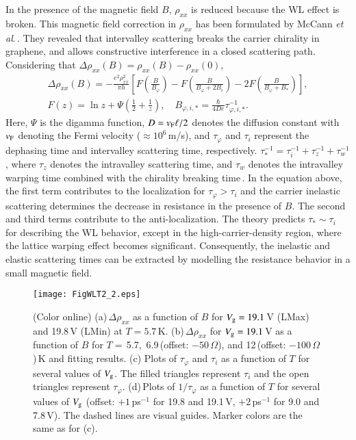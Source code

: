 \documentclass[final,5p,times,twocolumn]{elsarticle}
\begin{document}
In the presence of the magnetic field $B$, $\rho_{xx}$ is reduced because the WL effect is broken.
This magnetic field correction in $\rho_{xx}$ has been formulated by McCann {\it et al}.\,\cite{McCann}.
They revealed that intervalley scattering breaks the carrier chirality in graphene, and allows constructive interference in a closed scattering path.
Considering that $\Delta \rho_{xx}(B) = \rho_{xx}(B) - \rho_{xx}(0)$,  
%
\begin{gather}
\Delta \rho_{xx}(B) = -\frac{e^2 \rho_{xx}^2}{\pi h} \left [ F \left(\frac{B}{B_\varphi}\right)-F\left(\frac{B}{B_\varphi+2B_i}\right) - 2F\left( \frac{B}{B_\varphi + B_\ast} \right) \right ],  \label{eqDR} \\
%
F(z) = \ln z+\varPsi \left( \frac{1}{2} + \frac{1}{z} \right),\mspace{18mu} B_{\varphi, i, \ast} = \frac{\hbar}{4De}\tau^{-1}_{\varphi, i, \ast}. \label{eqtau}
\end{gather}
Here,  $\varPsi$ is the digamma function, $D=v_{\rm F}\ell/2$ denotes the diffusion constant with $v_{\rm F}$ denoting the Fermi velocity ($ \approx 10^6$\,m/s),
and $\tau_\varphi$ and $\tau_i$ represent the dephasing time and intervalley scattering time, respectively.
$\tau_\ast^{-1} = \tau_i ^{-1} + \tau_z^{-1} + \tau_w^{-1}$, where $\tau_z$ denotes the intravalley scattering time, and $\tau_w$ denotes the intravalley warping time combined with the chirality breaking time\,\cite{Morpurgo}.
In the equation above, the first term contributes to the localization for $\tau_\varphi > \tau_i$ and the carrier inelastic scattering determines the decrease in resistance in the presence of $B$.
The second and third terms contribute to the anti-localization.
The theory predicts $\tau_\ast \sim \tau_i$ for describing the WL behavior, except in the high-carrier-density region, where the lattice warping effect becomes significant. 
Consequently, the inelastic and elastic scattering times can be extracted by modelling the resistance behavior in a small magnetic field.




\begin{figure}  [t]
\texttt{[image: FigWLT2\_2.eps]}
\caption{\label{figWLT2}(Color online) (a)\,$\Delta \rho_{xx}$  as a function of $B$ for $V_{\rm g}= 19.1$\,V (LMax) and 19.8\,V (LMin) at $T=5.7$\,K. (b)\,$\Delta \rho_{xx}$ for $V_{\rm g}= 19.1$\,V as a function of $B$ for $T=$\,5.7,\, 6.9\,(offset: $-50$\,$\Omega$), and 12\,(offset: $-100$\,$\Omega$)\,K and fitting results. (c) Plots of $\tau_\varphi$ and $\tau_i$ as a function of $T$ for several values of $V_{\rm g}$. The filled triangles represent $\tau_i$ and the open triangles represent $\tau_\varphi$. (d)\,Plots of $1/\tau_\varphi$ as a function of $T$ for several values of $V_{\rm g}$ (offset: $+1$\,ps$^{-1}$ for 19.8 and 19.1\,V, $+2$\,ps$^{-1}$ for 9.0 and 7.8\,V). The dashed lines are visual guides. Marker colors are the same as for (c).}
\end{figure}
\end{document}
